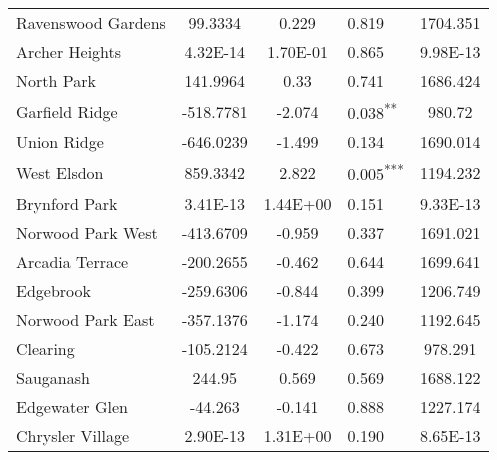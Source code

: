 \documentclass[12pt]{report}
\begin{document}
\begin{longtable}{l S[table-format=6.4] S[table-format=3.4] l S[table-format=4.4]}
	Ravenswood Gardens           & 99.3334              & 0.229            & 0.819                      & 1704.351                          \\
	Archer Heights               & 4.32E-14             & 1.70E-01         & 0.865                      & 9.98E-13                          \\
	North Park                   & 141.9964             & 0.33             & 0.741                      & 1686.424                          \\
	Garfield Ridge               & -518.7781            & -2.074           & 0.038\textsuperscript{**}  & 980.72                            \\
	Union Ridge                  & -646.0239            & -1.499           & 0.134                      & 1690.014                          \\
	West Elsdon                  & 859.3342             & 2.822            & 0.005\textsuperscript{***} & 1194.232                          \\
	Brynford Park                & 3.41E-13             & 1.44E+00         & 0.151                      & 9.33E-13                          \\
	Norwood Park West            & -413.6709            & -0.959           & 0.337                      & 1691.021                          \\
	Arcadia Terrace              & -200.2655            & -0.462           & 0.644                      & 1699.641                          \\
	Edgebrook                    & -259.6306            & -0.844           & 0.399                      & 1206.749                          \\
	Norwood Park East            & -357.1376            & -1.174           & 0.240                      & 1192.645                          \\
	Clearing                     & -105.2124            & -0.422           & 0.673                      & 978.291                           \\
	Sauganash                    & 244.95               & 0.569            & 0.569                      & 1688.122                          \\
	Edgewater Glen               & -44.263              & -0.141           & 0.888                      & 1227.174                          \\
	Chrysler Village             & 2.90E-13             & 1.31E+00         & 0.190                      & 8.65E-13                          \\

\end{longtable}
\end{document}
